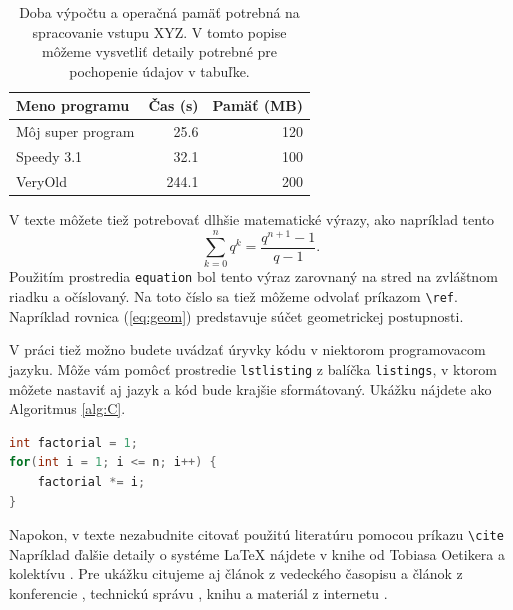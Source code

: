 \begin{table}
\caption[Doba výpočtu a operačná pamäť potrebná na spracovanie vstupu XYZ]{Doba výpočtu a operačná pamäť potrebná na spracovanie vstupu XYZ. V tomto popise môžeme vysvetliť detaily potrebné pre pochopenie údajov v tabuľke.}
\label{tab:cas}
\begin{center}
\begin{tabular}{lrr}
\hline 
Meno programu & Čas (s) & Pamäť (MB) \\
\hline
Môj super program & 25.6 & 120 \\
Speedy 3.1  & 32.1 & 100 \\
VeryOld & 244.1 & 200 \\
\hline
\end{tabular}
\end{center}
\end{table}

V texte môžete tiež potrebovať dlhšie matematické výrazy, ako napríklad tento
\begin{equation}
\sum_{k=0}^n q^k = \frac{q^{n+1}-1}{q-1}.
\label{eq:geom}
\end{equation}
Použitím prostredia \verb'equation' bol tento výraz zarovnaný na stred na
zvláštnom riadku a očíslovaný. Na toto číslo sa tiež môžeme odvolať
príkazom \verb'\ref'. Napríklad rovnica (\ref{eq:geom}) predstavuje súčet 
geometrickej postupnosti.

V práci tiež možno budete uvádzať úryvky kódu v niektorom programovacom jazyku. Môže vám pomôcť prostredie
\verb'lstlisting' z balíčka \verb'listings', v ktorom môžete nastaviť
aj jazyk a kód bude krajšie sformátovaný. Ukážku nájdete ako Algoritmus \ref{alg:C}.

\begin{lstlisting}[float,language=C,caption={Algoritmus na výpočet faktoriálu v jazyku C},label=alg:C]
int factorial = 1;
for(int i = 1; i <= n; i++) {
    factorial *= i;
}  
\end{lstlisting}

Napokon, v texte nezabudnite citovať použitú literatúru pomocou
príkazu \verb'\cite' Napríklad ďalšie detaily o systéme LaTeX nájdete
v knihe od Tobiasa Oetikera a kolektívu \cite{Oetiker2000}. Pre ukážku
citujeme aj článok z vedeckého časopisu \cite{clanok} a článok z
konferencie \cite{clanok_na_konferencii}, technickú správu
\cite{technical_report}, knihu \cite{kniha} a materiál z internetu
\cite{smernica}.


